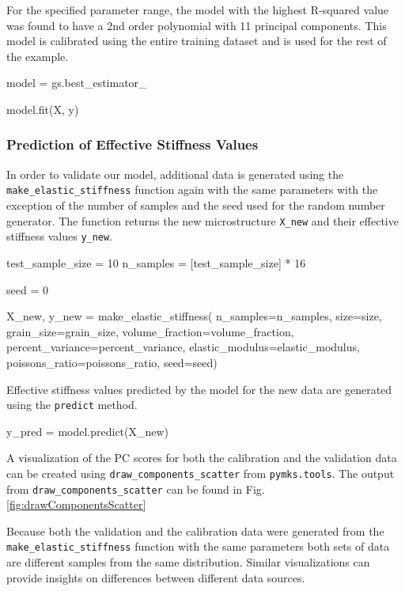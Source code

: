 \documentclass{bmcart}
\begin{document}
    For the specified parameter range, the model with the highest R-squared
value was found to have a 2nd order polynomial with 11 principal
components. This model is calibrated using the entire training dataset and is
used for the rest of the example.

\begin{_input}
model = gs.best_estimator_

model.fit(X, y)
\end{_input}

    \subsubsection{Prediction of Effective Stiffness Values}\label{prediction-using-mkshomogenizationmodel}

In order to validate our model, additional data is generated using the
\texttt{make\_elastic\_stiffness} function again with the same
parameters with the exception of the number of samples and the seed used
for the random number generator. The function returns the new
microstructure \texttt{X\_new} and their effective stiffness values
\texttt{y\_new}.

\begin{_input}
test_sample_size = 10
n_samples = [test_sample_size] * 16

seed = 0

X_new, y_new = make_elastic_stiffness(
    n_samples=n_samples, size=size,
    grain_size=grain_size,
    volume_fraction=volume_fraction,
    percent_variance=percent_variance,
    elastic_modulus=elastic_modulus,
    poissons_ratio=poissons_ratio,
    seed=seed)
\end{_input}
    Effective stiffness values predicted by the model for the new
data are generated using the \texttt{predict} method.

\begin{_input}
y_pred = model.predict(X_new)
\end{_input}

    A visualization of the PC scores for both the
calibration and the validation data can be created using
\texttt{draw\_components\_scatter} from \texttt{pymks.tools}. The output from
\texttt{draw\_components\_scatter} can be found in Fig. \ref{fig:drawComponentsScatter}

Because both the validation and the calibration data were generated from
the \texttt{make\_elastic\_stiffness} function with the same parameters
both sets of data are different samples from the same distribution.
Similar visualizations can provide insights on differences between
different data sources.
\end{document}
